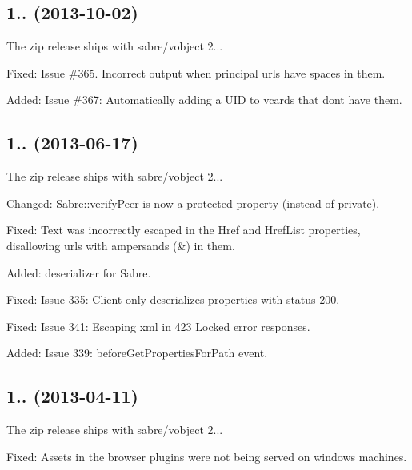 \subsection*{1.. (2013-\/10-\/02) }


\begin{DoxyItemize}
\item The zip release ships with sabre/vobject 2...
\item Fixed\+: Issue \#365. Incorrect output when principal urls have spaces in them.
\item Added\+: Issue \#367\+: Automatically adding a U\+ID to vcards that don\textquotesingle{}t have them.
\end{DoxyItemize}

\subsection*{1.. (2013-\/06-\/17) }


\begin{DoxyItemize}
\item The zip release ships with sabre/vobject 2...
\item Changed\+: Sabre\+::verify\+Peer is now a protected property (instead of private).
\item Fixed\+: Text was incorrectly escaped in the Href and Href\+List properties, disallowing urls with ampersands (\&) in them.
\item Added\+: deserializer for Sabre.
\item Fixed\+: Issue 335\+: Client only deserializes properties with status 200.
\item Fixed\+: Issue 341\+: Escaping xml in 423 Locked error responses.
\item Added\+: Issue 339\+: before\+Get\+Properties\+For\+Path event.
\end{DoxyItemize}

\subsection*{1.. (2013-\/04-\/11) }


\begin{DoxyItemize}
\item The zip release ships with sabre/vobject 2...
\item Fixed\+: Assets in the browser plugins were not being served on windows machines.
\end{DoxyItemize}

